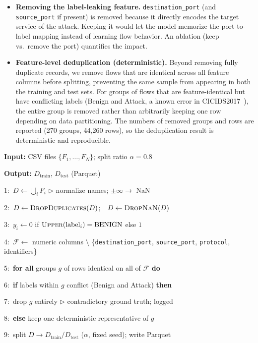 \documentclass[11pt,conference,a4paper]{IEEEtran}
\begin{document}
\begin{itemize}
  \item \textbf{Removing the label-leaking feature.} \texttt{destination\_port} (and \texttt{source\_port} if present) is removed because it directly encodes the target service of the attack. Keeping it would let the model memorize the port-to-label mapping instead of learning flow behavior. An ablation (keep vs.\ remove the port) quantifies the impact.
  \item \textbf{Feature-level deduplication (deterministic).} Beyond removing fully duplicate records, we remove flows that are identical across all feature columns before splitting, preventing the same sample from appearing in both the training and test sets. For groups of flows that are feature-identical but have conflicting labels (Benign and Attack, a known error in CICIDS2017~\cite{lanvin2023errors}), the entire group is removed rather than arbitrarily keeping one row depending on data partitioning. The numbers of removed groups and rows are reported (270 groups, 44,260 rows), so the deduplication result is deterministic and reproducible.
\end{itemize}


\begin{algorithm}[t]
\caption{Leakage-aware preparation of CICIDS2017}
\label{alg:prep}
\scriptsize
\begin{list}{}{\setlength{\leftmargin}{0.8em}\setlength{\itemsep}{1pt}\setlength{\parsep}{0pt}\setlength{\topsep}{2pt}}
\item \textbf{Input:} CSV files $\{F_1,\dots,F_N\}$; split ratio $\alpha{=}0.8$
\item \textbf{Output:} $D_{\text{train}}$, $D_{\text{test}}$ (Parquet)
\item 1:\ $D \gets \bigcup_i F_i$ \hfill $\triangleright$ normalize names; $\pm\infty \rightarrow$ NaN
\item 2:\ $D \gets \textsc{DropDuplicates}(D)$;\ \ $D \gets \textsc{DropNaN}(D)$
\item 3:\ $y_i \gets 0$ if $\textsc{Upper}(\mathrm{label}_i) = \mathrm{BENIGN}$ else $1$
\item 4:\ $\mathcal{F} \gets$ numeric columns $\setminus$ \{\texttt{destination\_port}, \texttt{source\_port}, \texttt{protocol}, identifiers\}
\item 5:\ \textbf{for all} groups $g$ of rows identical on all of $\mathcal{F}$ \textbf{do}
\item 6:\ \quad \textbf{if} labels within $g$ conflict (Benign and Attack) \textbf{then}
\item 7:\ \quad\quad drop $g$ entirely \hfill $\triangleright$ contradictory ground truth; logged
\item 8:\ \quad \textbf{else} keep one deterministic representative of $g$
\item 9:\ split $D \rightarrow D_{\text{train}}/D_{\text{test}}$ ($\alpha$, fixed seed); write Parquet
\end{list}
\end{algorithm}
\end{document}

